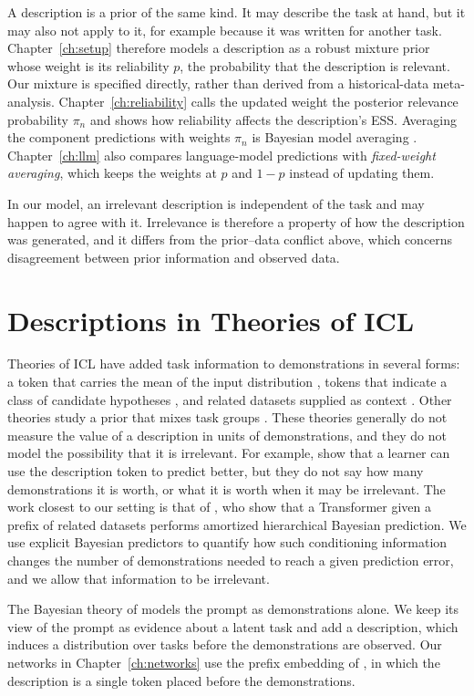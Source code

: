 A description is a prior of the same kind. It may describe the task at hand, but it may also not apply to it, for example because it was written for another task. Chapter~\ref{ch:setup} therefore models a description as a robust mixture prior whose weight is its reliability $p$, the probability that the description is relevant. Our mixture is specified directly, rather than derived from a historical-data meta-analysis. Chapter~\ref{ch:reliability} calls the updated weight the posterior relevance probability $\pi_n$ and shows how reliability affects the description's ESS. Averaging the component predictions with weights $\pi_n$ is Bayesian model averaging \citep{hoeting1999}. Chapter~\ref{ch:llm} also compares language-model predictions with \emph{fixed-weight averaging}, which keeps the weights at $p$ and $1-p$ instead of updating them.

In our model, an irrelevant description is independent of the task and may happen to agree with it. Irrelevance is therefore a property of how the description was generated, and it differs from the prior--data conflict above, which concerns disagreement between prior information and observed data.

\section{Descriptions in Theories of ICL}\label{sec:bg-theory}
Theories of ICL have added task information to demonstrations in several forms: a token that carries the mean of the input distribution \citep{huangge2025}, tokens that indicate a class of candidate hypotheses \citep{lin2025}, and related datasets supplied as context \citep{zhu2026}. Other theories study a prior that mixes task groups \citep{lin2024}. These theories generally do not measure the value of a description in units of demonstrations, and they do not model the possibility that it is irrelevant. For example, \citet{huangge2025} show that a learner can use the description token to predict better, but they do not say how many demonstrations it is worth, or what it is worth when it may be irrelevant. The work closest to our setting is that of \citet{zhu2026}, who show that a Transformer given a prefix of related datasets performs amortized hierarchical Bayesian prediction. We use explicit Bayesian predictors to quantify how such conditioning information changes the number of demonstrations needed to reach a given prediction error, and we allow that information to be irrelevant.

The Bayesian theory of \citet{xie2022} models the prompt as demonstrations alone. We keep its view of the prompt as evidence about a latent task and add a description, which induces a distribution over tasks before the demonstrations are observed. Our networks in Chapter~\ref{ch:networks} use the prefix embedding of \citet{huangge2025}, in which the description is a single token placed before the demonstrations.

